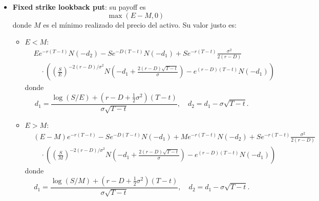 \begin{itemize}
    \item \textbf{Fixed strike lookback put}: su payoff es
    \begin{equation*}
        \max(E - M, 0)
    \end{equation*}
    donde $M$ es el mínimo realizado del precio del activo. Su valor justo es:
    \begin{itemize}
        \item $E < M$:
        \begin{equation*}
            \boxed{
                \begin{aligned}
                    & Ee^{-r(T-t)} N(-d_2) - Se^{-D(T-t)} N(-d_1) + Se^{-r(T-t)} \frac{\sigma^2}{2(r-D)} \\
                    & \quad \cdot \left( \left( \frac{S}{E} \right)^{-2(r-D)/\sigma^2} N\left(-d_1 + \frac{2(r-D)\sqrt{T-t}}{\sigma}\right) - e^{(r-D)(T-t)} N(-d_1) \right)
                \end{aligned}
            }
        \end{equation*}
        donde
        \begin{equation*}
            d_1 = \frac{\log(S/E) + (r-D + \frac{1}{2}\sigma^2)(T-t)}{\sigma\sqrt{T-t}}, \quad d_2 = d_1 - \sigma\sqrt{T-t}.
        \end{equation*}

        \item $E > M$:
        \begin{equation*}
            \boxed{
                \begin{aligned}
                    & (E-M)e^{-r(T-t)} - Se^{-D(T-t)} N(-d_1) + Me^{-r(T-t)} N(-d_2) + Se^{-r(T-t)} \frac{\sigma^2}{2(r-D)} \\
                    & \quad \cdot \left( \left( \frac{S}{M} \right)^{-2(r-D)/\sigma^2} N\left(-d_1 + \frac{2(r-D)\sqrt{T-t}}{\sigma}\right) - e^{(r-D)(T-t)} N(-d_1) \right)
                \end{aligned}
            }
        \end{equation*}
        donde
        \begin{equation*}
            d_1 = \frac{\log(S/M) + (r-D + \frac{1}{2}\sigma^2)(T-t)}{\sigma\sqrt{T-t}}, \quad d_2 = d_1 - \sigma\sqrt{T-t}.
        \end{equation*}
    \end{itemize}
    
\end{itemize}









